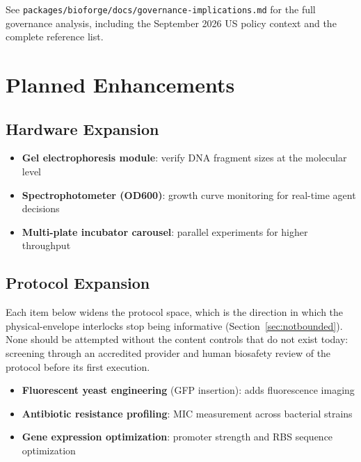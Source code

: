 \documentclass[11pt,letterpaper]{article}
\begin{document}
See \texttt{packages/bioforge/docs/governance-implications.md} for the full governance analysis, including the September 2026 US policy context and the complete reference list.


\section{Planned Enhancements}

\subsection{Hardware Expansion}
\begin{itemize}
  \item \textbf{Gel electrophoresis module}: verify DNA fragment sizes at the molecular level
  \item \textbf{Spectrophotometer (OD600)}: growth curve monitoring for real-time agent decisions
  \item \textbf{Multi-plate incubator carousel}: parallel experiments for higher throughput
\end{itemize}

\subsection{Protocol Expansion}

Each item below widens the protocol space, which is the direction in which the physical-envelope interlocks stop being informative (Section~\ref{sec:notbounded}). None should be attempted without the content controls that do not exist today: screening through an accredited provider and human biosafety review of the protocol before its first execution.

\begin{itemize}
  \item \textbf{Fluorescent yeast engineering} (GFP insertion): adds fluorescence imaging
  \item \textbf{Antibiotic resistance profiling}: MIC measurement across bacterial strains
  \item \textbf{Gene expression optimization}: promoter strength and RBS sequence optimization
\end{itemize}
\end{document}
